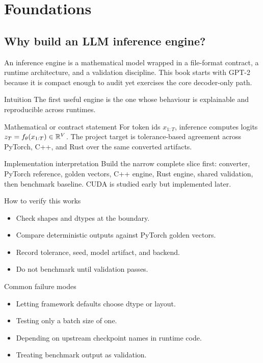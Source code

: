 \part{Foundations}

\chapter{Why build an LLM inference engine?}
\label{ch:why-build}
An inference engine is a mathematical model wrapped in a file-format contract, a runtime architecture, and a validation discipline. This book starts with GPT-2 because it is compact enough to audit yet exercises the core decoder-only path. \citep{vaswani2017attention,radford2018gpt,radford2019gpt2}



\begin{intuitionbox}{Intuition}
The first useful engine is the one whose behaviour is explainable and reproducible across runtimes.
\end{intuitionbox}

\begin{definitionbox}{Mathematical or contract statement}
For token ids $x_{1:T}$, inference computes logits $z_T=f_\theta(x_{1:T})\in\mathbb{R}^V$. The project target is tolerance-based agreement across PyTorch, C++, and Rust over the same converted artifacts.
\end{definitionbox}

\begin{implementationbox}{Implementation interpretation}
Build the narrow complete slice first: converter, PyTorch reference, golden vectors, C++ engine, Rust engine, shared validation, then benchmark baseline. CUDA is studied early but implemented later.
\end{implementationbox}

\begin{verificationbox}{How to verify this works}
\begin{itemize}
\item Check shapes and dtypes at the boundary.
\item Compare deterministic outputs against PyTorch golden vectors.
\item Record tolerance, seed, model artifact, and backend.
\item Do not benchmark until validation passes.
\end{itemize}
\end{verificationbox}

\begin{warningbox}{Common failure modes}
\begin{itemize}
\item Letting framework defaults choose dtype or layout.
\item Testing only a batch size of one.
\item Depending on upstream checkpoint names in runtime code.
\item Treating benchmark output as validation.
\end{itemize}
\end{warningbox}

